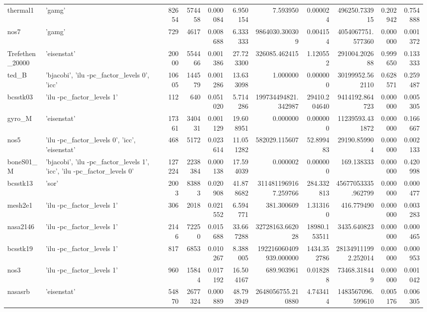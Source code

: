 \begin{tabular}{llrrrrrrrrr}
thermal1 & {'gamg'} & 82654 & 574458 & 0.000084 & 6.950154 & 7.593950 & 0.000024 & 496250.733915 & 0.202942 & 0.754888 \\
nos7 & {'gamg'} & 729 & 4617 & 0.008688 & 6.333333 & 9864030.300309 & 0.004154 & 4054067751.577360 & 0.000000 & 0.001372 \\
Trefethen\_20000 & {'eisenstat'} & 20000 & 554466 & 0.001386 & 27.723300 & 326085.462415 & 1.120552 & 291004.202688 & 0.999650 & 0.133333 \\
ted\_B & {'bjacobi', 'ilu -pc\_factor\_levels 0', 'icc'} & 10605 & 144579 & 0.001286 & 13.633098 & 1.000000 & 0.000000 & 30199952.562110 & 0.628571 & 0.259487 \\
bcsstk03 & {'ilu -pc\_factor\_levels 1'} & 112 & 640 & 0.051020 & 5.714286 & 199734494821.342987 & 29410.204640 & 9414192.864723 & 0.000000 & 0.005305 \\
gyro\_M & {'eisenstat'} & 17361 & 340431 & 0.001129 & 19.608951 & 0.000000 & 0.000000 & 11239593.431872 & 0.000000 & 0.166667 \\
nos5 & {'ilu -pc\_factor\_levels 0', 'icc', 'eisenstat'} & 468 & 5172 & 0.023614 & 11.051282 & 582029.115607 & 52.899483 & 29190.859904 & 0.000000 & 0.002133 \\
boneS01\_M & {'bjacobi', 'ilu -pc\_factor\_levels 1', 'icc', 'ilu -pc\_factor\_levels 0'} & 127224 & 2238384 & 0.000138 & 17.594039 & 0.000002 & 0.000000 & 169.138333 & 0.000000 & 0.420998 \\
bcsstk13 & {'sor'} & 2003 & 83883 & 0.020908 & 41.878682 & 3114811969167.259766 & 284.332813 & 45677053335.962799 & 0.000000 & 0.000477 \\
mesh2e1 & {'ilu -pc\_factor\_levels 1'} & 306 & 2018 & 0.021552 & 6.594771 & 381.300609 & 1.313160 & 416.779490 & 0.000000 & 0.003283 \\
nasa2146 & {'ilu -pc\_factor\_levels 1'} & 2146 & 72250 & 0.015688 & 33.667288 & 32728163.662028 & 18980.153511 & 3435.640823 & 0.000000 & 0.000465 \\
bcsstk19 & {'ilu -pc\_factor\_levels 1'} & 817 & 6853 & 0.010267 & 8.388005 & 192216060409939.000000 & 1434.352786 & 281349111992.252014 & 0.000000 & 0.000953 \\
nos3 & {'ilu -pc\_factor\_levels 1'} & 960 & 15844 & 0.017192 & 16.504167 & 689.903961 & 0.018288 & 73468.318449 & 0.000000 & 0.001042 \\
nasasrb & {'eisenstat'} & 54870 & 2677324 & 0.000889 & 48.793949 & 2648056755.210880 & 4.743414 & 1483567096.599610 & 0.005176 & 0.006305 \\

\end{tabular}
